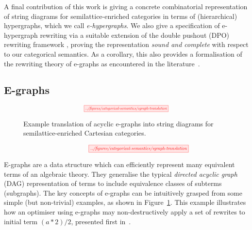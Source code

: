 A final contribution of this work is giving a concrete combinatorial representation of string diagrams for semilattice-enriched categories in terms of (hierarchical)  hypergraphs, which we call \textit{e-hypergraphs}.
We also give a specification of e-hypergraph rewriting via a suitable extension of the double pushout (DPO) rewriting framework 
\cite{dpo, bonchi_string_2022-1,bonchi_string_2022-2,bonchi_string_2022},  proving the representation \textit{sound and complete} with respect to our categorical semantics.  
As a corollary, this also provides a formalisation of the rewriting theory of e-graphs as encountered in the literature~\cite{EggPaper}.

\subsection{E-graphs}

\ifdefined \ONECOLUMN
\begin{figure}
	\[
		\scalebox{0.55}{
		\tikzfig{../figures/categorical-semantics/egraph-translation}
		}
	\]
	\caption{Example translation of acyclic e-graphs into string diagrams for semilattice-enriched Cartesian categories. }
	\label{fig:e-graph-example}
	\end{figure}
\else
\begin{figure*}
\[
	\hspace{1.3cm}
    \scalebox{0.65}{
    \tikzfig{../figures/categorical-semantics/egraph-translation}
    }
\]
\caption{Example translation of acyclic e-graphs into string diagrams for semilattice-enriched Cartesian categories. }
\label{fig:e-graph-example}
\end{figure*}
\fi

E-graphs are a data structure which can efficiently represent many equivalent terms of an algebraic theory.
They generalise the typical \emph{directed acyclic graph} (DAG) representation of terms to include equivalence classes of subterms (subgraphs).
The key concepts of e-graphs can be intuitively grasped from some simple (but non-trivial) examples, as shown in Figure~\ref{fig:e-graph-example}.
This example illustrates how an optimiser using e-graphs may non-destructively apply a set of rewrites to initial term $(a * 2) / 2$, presented first in~\cite{EggPaper}.

